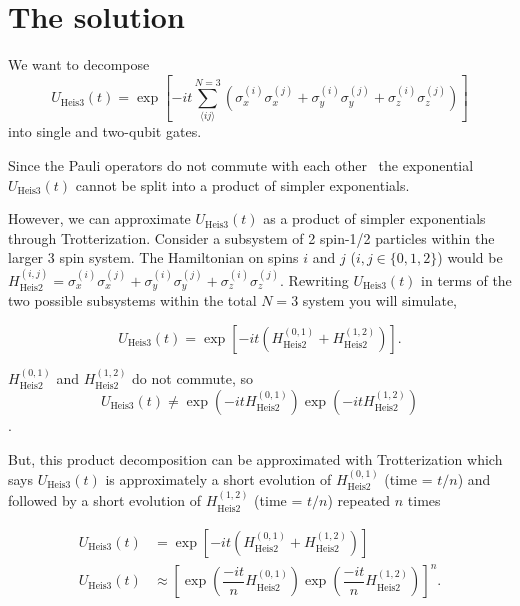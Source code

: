 \section{The solution}
We want to decompose 
\begin{equation}
    U_{\text{Heis3}}(t) = \exp\left[-it \sum_{\langle ij \rangle}^{N=3} \left(\sigma_x^{(i)}\sigma_x^{(j)} + \sigma_y^{(i)}\sigma_y^{(j)} + \sigma_z^{(i)}\sigma_z^{(j)}\right) \right]
    \end{equation}
into single and two-qubit gates.

Since the Pauli operators do not commute with each other~\cite{Shankar} the exponential $U_{\text{Heis3}}(t)$ cannot be split into a product of simpler exponentials.

However, we can approximate $U_{\text{Heis3}}(t)$ as a product of simpler exponentials through Trotterization. Consider a subsystem of 2 spin-1/2 particles within the larger 3 spin system. The Hamiltonian on spins $i$ and $j$ ($i,j \in \{0,1,2\}$) would be $H^{(i,j)}_{\text{Heis2}} = \sigma_x^{(i)}\sigma_x^{(j)} + \sigma_y^{(i)}\sigma_y^{(j)} + \sigma_z^{(i)}\sigma_z^{(j)}$. Rewriting $U_{\text{Heis3}}(t)$ in terms of the two possible subsystems within the total $N=3$ system you will simulate,

\begin{equation}
U_{\text{Heis3}}(t) = \exp\left[-i t \left(H^{(0,1)}_{\text{Heis2}} + H^{(1,2)}_{\text{Heis2}} \right)\right].
\end{equation}

$H^{(0,1)}_{\text{Heis2}}$ and $H^{(1,2)}_{\text{Heis2}}$ do not commute, so
\begin{equation}
 U_{\text{Heis3}}(t) \neq \exp\left(-i t H^{(0,1)}_{\text{Heis2}}\right) \exp\left(-i t H^{(1,2)}_{\text{Heis2}} \right)
\end{equation}. 
 
 But, this product decomposition can be approximated with Trotterization which says $U_{\text{Heis3}}(t)$ is approximately a short evolution of $H^{(0,1)}_{\text{Heis2}}$ (time = $t/n$) and followed by a short evolution of $H^{(1,2)}_{\text{Heis2}}$ (time = $t/n$) repeated $n$ times


\begin{align}
U_{\text{Heis3}}(t) &= \exp\left[-i t \left(H^{(0,1)}_{\text{Heis2}} + H^{(1,2)}_{\text{Heis2}} \right)\right] \\
U_{\text{Heis3}}(t) &\approx \left[\exp\left(\dfrac{-it}{n}H^{(0,1)}_{\text{Heis2}}\right) \exp\left(\dfrac{-it}{n}H^{(1,2)}_{\text{Heis2}} \right)\right]^n.
\end{align}


